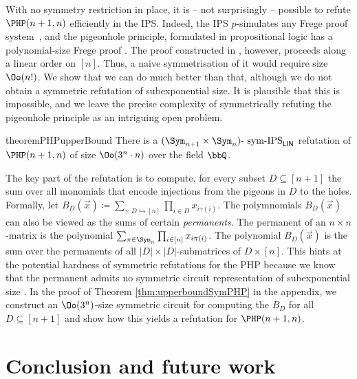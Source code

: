 \documentclass[a4paper,UKenglish,cleveref, autoref, thm-restate]{lipics-v2021}
\newcommand{\symIPSlin}{\text{ \upshape sym-IPS}_{\mathsf{LIN}}}
\begin{document}
With no symmetry restriction in place, it is -- not surprisingly -- possible to refute $\PHP(n+1,n)$ efficiently in the IPS.  Indeed, the IPS $p$-simulates any Frege proof system~\cite{IPS}, and the pigeonhole principle, formulated in propositional logic has a polynomial-size Frege proof \cite{buss1987polynomial}. The proof constructed in \cite{buss1987polynomial}, however, proceeds along a linear order on $[n]$. Thus, a naive symmetrisation of it would require size $\Oo(n!)$.
We show that we can do much better than that, although we do not obtain a symmetric refutation of subexponential size. It is plausible that this is impossible, and we leave the precise complexity of symmetrically refuting the pigeonhole principle as an intriguing open problem.
\begin{restatable}{theorem}{PHPupperBound}
	\label{thm:upperboundSymPHP}
	There is a $(\Sym_{n+1} \times \Sym_n)\text{-}\symIPSlin$ refutation of $\PHP(n+1,n)$ of size $\Oo(3^n \cdot n)$ over the field $\bbQ$.
\end{restatable}	
The key part of the refutation is to compute, for every subset $D \subseteq [n+1]$ the sum over all monomials that encode injections from the pigeons in $D$ to the holes. Formally, let
$
B_D(\vec x) \coloneqq \sum_{\gamma \colon D \hookrightarrow [n]} \prod_{i \in D} x_{i\gamma(i)}.
$
The polymnomials $B_D(\vec x)$ can also be viewed as the sums of certain \emph{permanents}. The permanent of an $n \times n$-matrix is the polynomial $\sum_{\pi \in \Sym_n} \prod_{i \in [n]} x_{i\pi(i)}$. The polynomial $B_D(\vec x)$ is the sum over the permanents of all $|D| \times |D|$-submatrices of $D \times [n]$. 
This hints at the potential hardness of symmetric refutations for the PHP because we know that the permanent admits no symmetric circuit representation of subexponential size \cite{DawarW20}. 
In the proof of Theorem \ref{thm:upperboundSymPHP} in the appendix, we construct an $\Oo(3^n)$-size symmetric circuit for computing the $B_D$ for all $D \subseteq [n+1]$ and show how this yields a refutation for $\PHP(n+1,n)$.


\section{Conclusion and future work}
\end{document}

